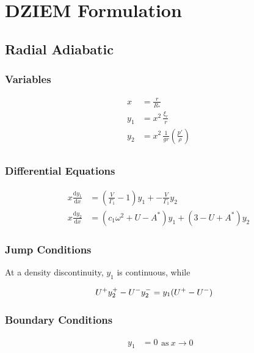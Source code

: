 \documentclass[fleqn]{article}
\newcommand{\diff}{\ensuremath{\mathrm{d}}}
\newcommand{\Vg}{\ensuremath{\frac{V}{\Gamma_{1}}}}
\newcommand{\As}{\ensuremath{A^{\ast}}}
\newcommand{\Rstar}{\ensuremath{R_{\ast}}}
\begin{document}

\section*{DZIEM Formulation}

\subsection*{Radial Adiabatic}

\subsubsection*{Variables}

\begin{align*}
x     &= \frac{r}{\Rstar} \\
y_{1} &= x^{2}\, \frac{\xi_{r}}{r} \\
y_{2} &= x^{2}\, \frac{1}{gr} \left( \frac{p'}{\rho} \right) \\
\end{align*}

\subsubsection*{Differential Equations}

\begin{align*}
x \frac{\diff y_{1}}{\diff x} &=
\left(\Vg - 1 \right) y_{1} +
- \Vg y_{2} \\
x \frac{\diff y_{2}}{\diff x} &=
(c_{1} \omega^{2} + U - \As ) y_{1} +
(3 - U + \As) y_{2}
\end{align*}

\subsubsection*{Jump Conditions}

At a density discontinuity, $y_{1}$ is continuous, while

\begin{align*}
U^{\rm +} y_{2}^{+} - U^{-} y_{2}^{-} &= y_{1} (U^{+} - U^{-})
\end{align*}

\subsubsection*{Boundary Conditions}

\begin{equation*}
\begin{aligned}
y_{1} &= 0
\end{aligned}
\text{as}\ x \rightarrow 0
\end{equation*}
\end{document}
